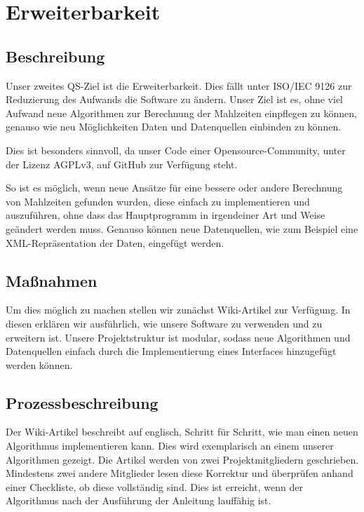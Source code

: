 \documentclass[accentcolor=tud0b,12pt,paper=a4]{tudreport}
\begin{document}
\section{Erweiterbarkeit}

\subsection{Beschreibung}

Unser zweites QS-Ziel ist die Erweiterbarkeit. Dies fällt unter ISO/IEC 9126 zur Reduzierung des Aufwands die Software zu ändern. Unser Ziel ist es, ohne viel Aufwand neue Algorithmen zur Berechnung der Mahlzeiten einpflegen zu können, genauso wie neu Möglichkeiten Daten und Datenquellen einbinden zu können.

Dies ist besonders sinnvoll, da unser Code einer Opensource-Community, unter der Lizenz AGPLv3, auf GitHub zur Verfügung steht. 

So ist es möglich, wenn neue Ansätze für eine bessere oder andere Berechnung von Mahlzeiten gefunden wurden, diese einfach zu implementieren und auszuführen, ohne dass das Hauptprogramm in irgendeiner Art und Weise geändert werden muss. Genauso können neue Datenquellen, wie zum Beispiel eine XML-Repräsentation der Daten, eingefügt werden.

\subsection{Maßnahmen}

Um dies möglich zu machen stellen wir zunächst Wiki-Artikel zur Verfügung. In diesen erklären wir ausführlich, wie unsere Software zu verwenden und zu erweitern ist. Unsere Projektstruktur ist modular, sodass neue Algorithmen und Datenquellen einfach durch die Implementierung eines Interfaces hinzugefügt werden können. 

\subsection{Prozessbeschreibung}

Der Wiki-Artikel beschreibt auf englisch, Schritt für Schritt, wie man einen neuen Algorithmus implementieren kann. Dies wird exemplarisch an einem unserer Algorithmen gezeigt. Die Artikel werden von zwei Projektmitgliedern geschrieben. Mindestens zwei andere Mitglieder lesen diese Korrektur und überprüfen anhand einer Checkliste, ob diese vollständig sind. Dies ist erreicht, wenn der Algorithmus nach der Ausführung der Anleitung lauffähig ist.
\end{document}
